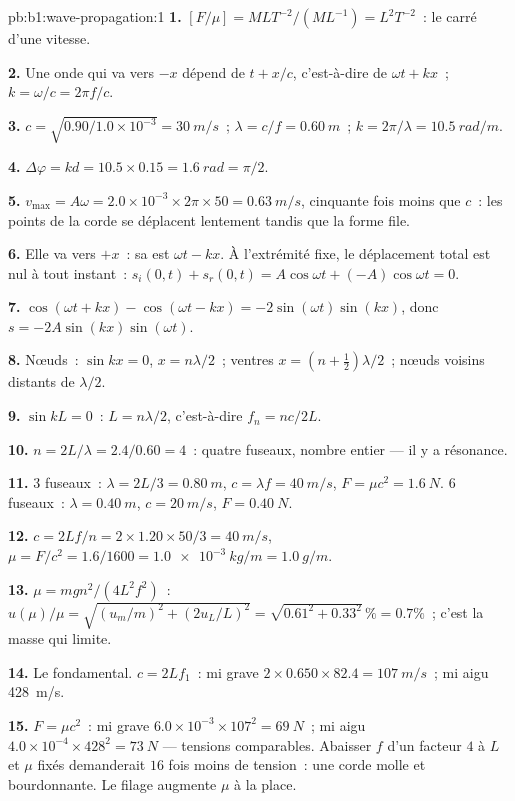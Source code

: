 \begin{solution}{pb:b1:wave-propagation:1}
\textbf{1.} $[F/\mu] = M L T^{-2}/(M L^{-1}) = L^2 T^{-2}$~: le carré
d'une vitesse.

\textbf{2.} Une onde qui va vers $-x$ dépend de $t + x/c$, c'est-à-dire de
$\omega t + kx$~; $k = \omega/c = 2\pi f/c$.

\textbf{3.} $c = \sqrt{0.90/1.0\times10^{-3}} = \qty{30}{m/s}$~;
$\lambda = c/f = \qty{0.60}{m}$~; $k = 2\pi/\lambda = \qty{10.5}{rad/m}$.

\textbf{4.} $\Delta\varphi = kd = 10.5 \times 0.15 = \qty{1.6}{rad} = \pi/2$.

\textbf{5.} $v_{\max} = A\omega = 2.0\times10^{-3} \times 2\pi \times 50 =
\qty{0.63}{m/s}$, cinquante fois moins que $c$~: les points de la corde
se déplacent lentement tandis que la forme file.

\textbf{6.} Elle va vers $+x$~: sa  est $\omega t - kx$. À
l'extrémité fixe, le déplacement total est nul à tout instant~: $s_i(0, t) + s_r(0, t)
= A\cos\omega t + (-A)\cos\omega t = 0$.

\textbf{7.} $\cos(\omega t + kx) - \cos(\omega t - kx) =
-2\sin(\omega t)\sin(kx)$, donc $s = -2A\sin(kx)\sin(\omega t)$.

\textbf{8.} Nœuds~: $\sin kx = 0$, $x = n\lambda/2$~; ventres $x = (n +
\tfrac12)\lambda/2$~; nœuds voisins distants de $\lambda/2$.

\textbf{9.} $\sin kL = 0$~: $L = n\lambda/2$, c'est-à-dire $f_n = nc/2L$.

\textbf{10.} $n = 2L/\lambda = 2.4/0.60 = 4$~: quatre fuseaux, nombre
entier --- il y a résonance.

\textbf{11.} $3$ fuseaux~: $\lambda = 2L/3 = \qty{0.80}{m}$, $c = \lambda f
= \qty{40}{m/s}$, $F = \mu c^2 = \qty{1.6}{N}$. $6$ fuseaux~: $\lambda =
\qty{0.40}{m}$, $c = \qty{20}{m/s}$, $F = \qty{0.40}{N}$.

\textbf{12.} $c = 2Lf/n = 2 \times 1.20 \times 50/3 = \qty{40}{m/s}$,
$\mu = F/c^2 = 1.6/1600 = \qty{1.0e-3}{kg/m} = \qty{1.0}{g/m}$.

\textbf{13.} $\mu = mgn^2/(4L^2f^2)$~: $u(\mu)/\mu = \sqrt{(u_m/m)^2 +
(2u_L/L)^2} = \sqrt{0.61^2 + 0.33^2}\,\% = 0.7\%$~; c'est la masse qui limite.

\textbf{14.} Le fondamental. $c = 2Lf_1$~: mi grave $2 \times 0.650 \times
82.4 = \qty{107}{m/s}$~; mi aigu \qty{428}{m/s}.

\textbf{15.} $F = \mu c^2$~: mi grave $6.0\times10^{-3} \times 107^2 =
\qty{69}{N}$~; mi aigu $4.0\times10^{-4} \times 428^2 = \qty{73}{N}$ ---
tensions comparables. Abaisser $f$ d'un facteur $4$ à $L$ et $\mu$ fixés
demanderait $16$ fois moins de tension~: une corde molle et bourdonnante.
Le filage augmente $\mu$ à la place.


\end{solution}
